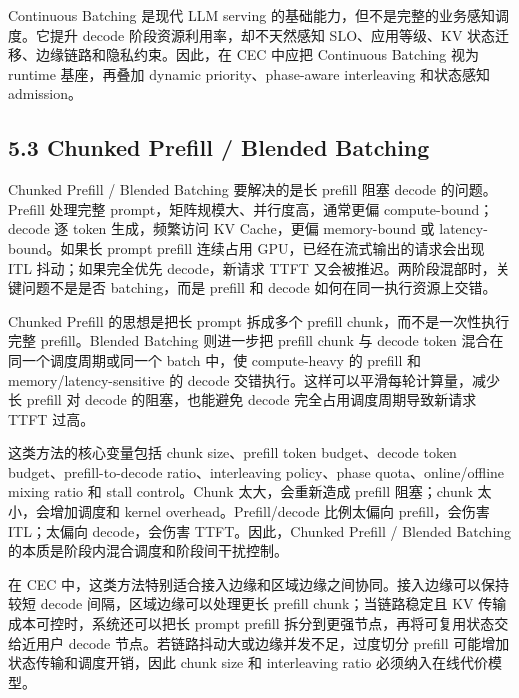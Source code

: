 \documentclass[a4paper,twocolumn,10pt]{ctexart}
\begin{document}
Continuous Batching 是现代 LLM serving 的基础能力，但不是完整的业务感知调度。它提升 decode 阶段资源利用率，却不天然感知 SLO、应用等级、KV 状态迁移、边缘链路和隐私约束。因此，在 CEC 中应把 Continuous Batching 视为 runtime 基座，再叠加 dynamic priority、phase-aware interleaving 和状态感知 admission。


\subsection{5.3 Chunked Prefill / Blended Batching}

Chunked Prefill / Blended Batching 要解决的是长 prefill 阻塞 decode 的问题。Prefill 处理完整 prompt，矩阵规模大、并行度高，通常更偏 compute-bound；decode 逐 token 生成，频繁访问 KV Cache，更偏 memory-bound 或 latency-bound。如果长 prompt prefill 连续占用 GPU，已经在流式输出的请求会出现 ITL 抖动；如果完全优先 decode，新请求 TTFT 又会被推迟。两阶段混部时，关键问题不是是否 batching，而是 prefill 和 decode 如何在同一执行资源上交错。


Chunked Prefill 的思想是把长 prompt 拆成多个 prefill chunk，而不是一次性执行完整 prefill。Blended Batching 则进一步把 prefill chunk 与 decode token 混合在同一个调度周期或同一个 batch 中，使 compute-heavy 的 prefill 和 memory/latency-sensitive 的 decode 交错执行。这样可以平滑每轮计算量，减少长 prefill 对 decode 的阻塞，也能避免 decode 完全占用调度周期导致新请求 TTFT 过高。


这类方法的核心变量包括 chunk size、prefill token budget、decode token budget、prefill-to-decode ratio、interleaving policy、phase quota、online/offline mixing ratio 和 stall control。Chunk 太大，会重新造成 prefill 阻塞；chunk 太小，会增加调度和 kernel overhead。Prefill/decode 比例太偏向 prefill，会伤害 ITL；太偏向 decode，会伤害 TTFT。因此，Chunked Prefill / Blended Batching 的本质是阶段内混合调度和阶段间干扰控制。


在 CEC 中，这类方法特别适合接入边缘和区域边缘之间协同。接入边缘可以保持较短 decode 间隔，区域边缘可以处理更长 prefill chunk；当链路稳定且 KV 传输成本可控时，系统还可以把长 prompt prefill 拆分到更强节点，再将可复用状态交给近用户 decode 节点。若链路抖动大或边缘并发不足，过度切分 prefill 可能增加状态传输和调度开销，因此 chunk size 和 interleaving ratio 必须纳入在线代价模型。
\end{document}

